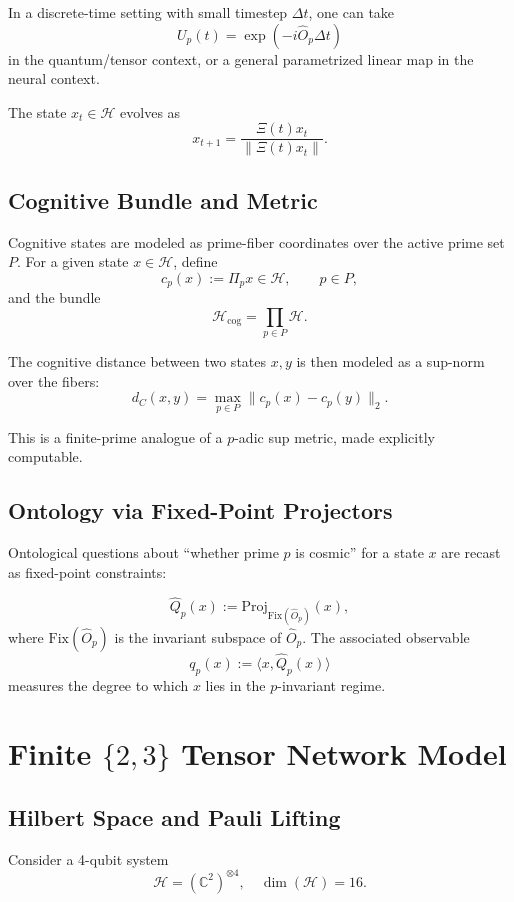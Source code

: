 \documentclass[11pt]{article}
\begin{document}
In a discrete-time setting with small timestep $\Delta t$, one can take
\[
U_p(t) = \exp\!\left(-i \hat{O}_p\Delta t\right)
\]
in the quantum/tensor context, or a general parametrized linear map in the neural context.

The state $x_t \in \mathcal{H}$ evolves as
\[
x_{t+1} = \frac{\Xi(t) x_t}{\|\Xi(t) x_t\|}.
\]

\subsection{Cognitive Bundle and Metric}

Cognitive states are modeled as prime-fiber coordinates over the active prime set $P$. For a given state $x \in \mathcal{H}$, define
\[
c_p(x) := \Pi_p x \in \mathcal{H}, \qquad p \in P,
\]
and the bundle
\[
\mathcal{H}_{\mathrm{cog}} = \prod_{p\in P} \mathcal{H}.
\]

The cognitive distance between two states $x,y$ is then modeled as a sup-norm over the fibers:
\[
d_C(x,y) = \max_{p\in P} \|c_p(x) - c_p(y)\|_2.
\]

This is a finite-prime analogue of a $p$-adic sup metric, made explicitly computable.

\subsection{Ontology via Fixed-Point Projectors}

Ontological questions about ``whether prime $p$ is cosmic'' for a state $x$ are recast as fixed-point constraints:

\[
\hat{Q}_p(x) := \mathrm{Proj}_{\mathrm{Fix}(\hat{O}_p)}(x),
\]
where $\mathrm{Fix}(\hat{O}_p)$ is the invariant subspace of $\hat{O}_p$. The associated observable
\[
q_p(x) := \langle x,\hat{Q}_p(x)\rangle
\]
measures the degree to which $x$ lies in the $p$-invariant regime.

\section{Finite $\{2,3\}$ Tensor Network Model}

\subsection{Hilbert Space and Pauli Lifting}

Consider a 4-qubit system
\[
\mathcal{H} = (\mathbb{C}^2)^{\otimes 4},\quad \dim(\mathcal{H})=16.
\]
\end{document}
